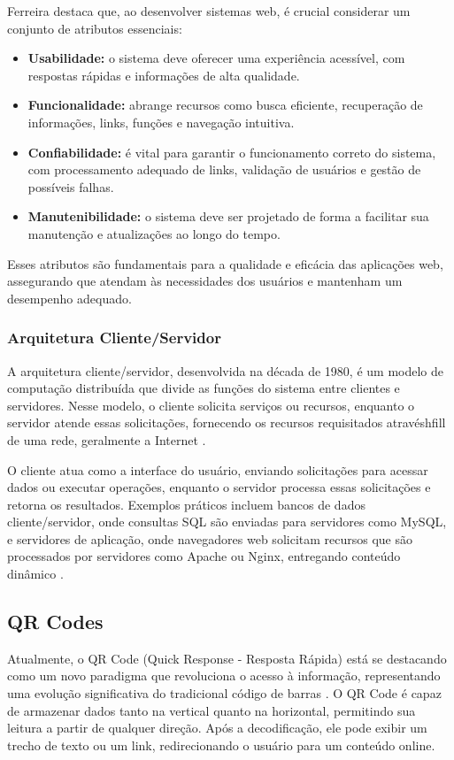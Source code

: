 Ferreira \cite{ferreira2023} destaca que, ao desenvolver sistemas web, é crucial considerar um conjunto de atributos essenciais:

\begin{itemize}
    \item \textbf{Usabilidade:} o sistema deve oferecer uma experiência acessível, com respostas rápidas e informações de alta qualidade.
    \item \textbf{Funcionalidade:} abrange recursos como busca eficiente, recuperação de informações, links, funções e navegação intuitiva.
    \item \textbf{Confiabilidade:} é vital para garantir o funcionamento correto do sistema, com processamento adequado de links, validação de usuários e gestão de possíveis falhas.
    \item \textbf{Manutenibilidade:} o sistema deve ser projetado de forma a facilitar sua manutenção e atualizações ao longo do tempo.
\end{itemize}

Esses atributos são fundamentais para a qualidade e eficácia das aplicações web, assegurando que atendam às necessidades dos usuários e mantenham um desempenho adequado.

\subsubsection{Arquitetura Cliente/Servidor}
A arquitetura cliente/servidor, desenvolvida na década de 1980, é um modelo de computação distribuída que divide as funções do sistema entre clientes e servidores. Nesse modelo, o cliente solicita serviços ou recursos, enquanto o servidor atende essas solicitações, fornecendo os recursos requisitados atravéshfill de uma rede, geralmente a Internet \cite{ferreira2023}.

O cliente atua como a interface do usuário, enviando solicitações para acessar dados ou executar operações, enquanto o servidor processa essas solicitações e retorna os resultados. Exemplos práticos incluem bancos de dados cliente/servidor, onde consultas SQL são enviadas para servidores como MySQL, e servidores de aplicação, onde navegadores web solicitam recursos que são processados por servidores como Apache ou Nginx, entregando conteúdo dinâmico \cite{ferreira2023}.

\subsection{QR Codes}
Atualmente, o QR Code (Quick Response - Resposta Rápida) está se destacando como um novo paradigma que revoluciona o acesso à informação, representando uma evolução significativa do tradicional código de barras \cite{okada2011}. O QR Code é capaz de armazenar dados tanto na vertical quanto na horizontal, permitindo sua leitura a partir de qualquer direção. Após a decodificação, ele pode exibir um trecho de texto ou um link, redirecionando o usuário para um conteúdo online.

